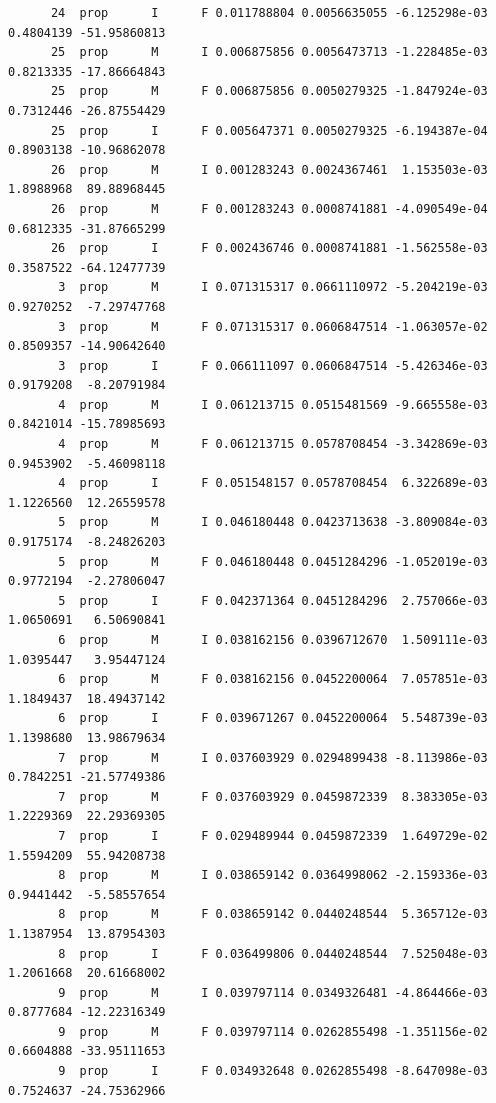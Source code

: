 \documentclass[
  landscape]{article}
\begin{document}
\begin{verbatim}
      24  prop      I      F 0.011788804 0.0056635055 -6.125298e-03 0.4804139 -51.95860813
      25  prop      M      I 0.006875856 0.0056473713 -1.228485e-03 0.8213335 -17.86664843
      25  prop      M      F 0.006875856 0.0050279325 -1.847924e-03 0.7312446 -26.87554429
      25  prop      I      F 0.005647371 0.0050279325 -6.194387e-04 0.8903138 -10.96862078
      26  prop      M      I 0.001283243 0.0024367461  1.153503e-03 1.8988968  89.88968445
      26  prop      M      F 0.001283243 0.0008741881 -4.090549e-04 0.6812335 -31.87665299
      26  prop      I      F 0.002436746 0.0008741881 -1.562558e-03 0.3587522 -64.12477739
       3  prop      M      I 0.071315317 0.0661110972 -5.204219e-03 0.9270252  -7.29747768
       3  prop      M      F 0.071315317 0.0606847514 -1.063057e-02 0.8509357 -14.90642640
       3  prop      I      F 0.066111097 0.0606847514 -5.426346e-03 0.9179208  -8.20791984
       4  prop      M      I 0.061213715 0.0515481569 -9.665558e-03 0.8421014 -15.78985693
       4  prop      M      F 0.061213715 0.0578708454 -3.342869e-03 0.9453902  -5.46098118
       4  prop      I      F 0.051548157 0.0578708454  6.322689e-03 1.1226560  12.26559578
       5  prop      M      I 0.046180448 0.0423713638 -3.809084e-03 0.9175174  -8.24826203
       5  prop      M      F 0.046180448 0.0451284296 -1.052019e-03 0.9772194  -2.27806047
       5  prop      I      F 0.042371364 0.0451284296  2.757066e-03 1.0650691   6.50690841
       6  prop      M      I 0.038162156 0.0396712670  1.509111e-03 1.0395447   3.95447124
       6  prop      M      F 0.038162156 0.0452200064  7.057851e-03 1.1849437  18.49437142
       6  prop      I      F 0.039671267 0.0452200064  5.548739e-03 1.1398680  13.98679634
       7  prop      M      I 0.037603929 0.0294899438 -8.113986e-03 0.7842251 -21.57749386
       7  prop      M      F 0.037603929 0.0459872339  8.383305e-03 1.2229369  22.29369305
       7  prop      I      F 0.029489944 0.0459872339  1.649729e-02 1.5594209  55.94208738
       8  prop      M      I 0.038659142 0.0364998062 -2.159336e-03 0.9441442  -5.58557654
       8  prop      M      F 0.038659142 0.0440248544  5.365712e-03 1.1387954  13.87954303
       8  prop      I      F 0.036499806 0.0440248544  7.525048e-03 1.2061668  20.61668002
       9  prop      M      I 0.039797114 0.0349326481 -4.864466e-03 0.8777684 -12.22316349
       9  prop      M      F 0.039797114 0.0262855498 -1.351156e-02 0.6604888 -33.95111653
       9  prop      I      F 0.034932648 0.0262855498 -8.647098e-03 0.7524637 -24.75362966
\end{verbatim}
\end{document}
